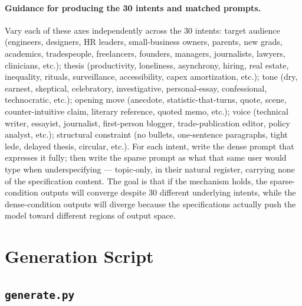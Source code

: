 \documentclass[11pt]{article}
\begin{document}
\paragraph{Guidance for producing the 30 intents and matched prompts.}
Vary each of these axes independently across the 30 intents: target audience (engineers, designers, HR leaders, small-business owners, parents, new grads, academics, tradespeople, freelancers, founders, managers, journalists, lawyers, clinicians, etc.); thesis (productivity, loneliness, asynchrony, hiring, real estate, inequality, rituals, surveillance, accessibility, capex amortization, etc.); tone (dry, earnest, skeptical, celebratory, investigative, personal-essay, confessional, technocratic, etc.); opening move (anecdote, statistic-that-turns, quote, scene, counter-intuitive claim, literary reference, quoted memo, etc.); voice (technical writer, essayist, journalist, first-person blogger, trade-publication editor, policy analyst, etc.); structural constraint (no bullets, one-sentence paragraphs, tight lede, delayed thesis, circular, etc.). For each intent, write the dense prompt that expresses it fully; then write the sparse prompt as what that same user would type when underspecifying --- topic-only, in their natural register, carrying none of the specification content. The goal is that if the mechanism holds, the sparse-condition outputs will converge despite 30 different underlying intents, while the dense-condition outputs will diverge because the specifications actually push the model toward different regions of output space.

\newpage

\section{Generation Script}

\subsection{\texttt{generate.py}}
\end{document}
